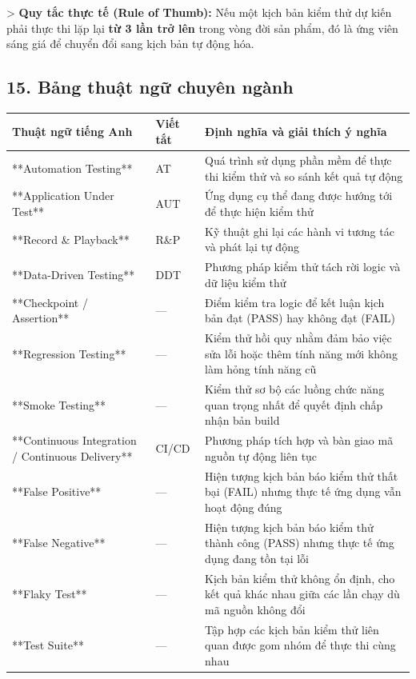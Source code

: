> \textbf{Quy tắc thực tế (Rule of Thumb):} Nếu một kịch bản kiểm thử dự kiến phải thực thi lặp lại \textbf{từ 3 lần trở lên} trong vòng đời sản phẩm, đó là ứng viên sáng giá để chuyển đổi sang kịch bản tự động hóa.


\subsection{15. Bảng thuật ngữ chuyên ngành}

\begin{table}[H]
\centering
\begin{tabular}{|l|l|l|}
\hline
\textbf{Thuật ngữ tiếng Anh} & \textbf{Viết tắt} & \textbf{Định nghĩa và giải thích ý nghĩa} \\ \hline
**Automation Testing** & AT & Quá trình sử dụng phần mềm để thực thi kiểm thử và so sánh kết quả tự động \\ \hline
**Application Under Test** & AUT & Ứng dụng cụ thể đang được hướng tới để thực hiện kiểm thử \\ \hline
**Record \& Playback** & R\&P & Kỹ thuật ghi lại các hành vi tương tác và phát lại tự động \\ \hline
**Data-Driven Testing** & DDT & Phương pháp kiểm thử tách rời logic và dữ liệu kiểm thử \\ \hline
**Checkpoint / Assertion** & — & Điểm kiểm tra logic để kết luận kịch bản đạt (PASS) hay không đạt (FAIL) \\ \hline
**Regression Testing** & — & Kiểm thử hồi quy nhằm đảm bảo việc sửa lỗi hoặc thêm tính năng mới không làm hỏng tính năng cũ \\ \hline
**Smoke Testing** & — & Kiểm thử sơ bộ các luồng chức năng quan trọng nhất để quyết định chấp nhận bản build \\ \hline
**Continuous Integration / Continuous Delivery** & CI/CD & Phương pháp tích hợp và bàn giao mã nguồn tự động liên tục \\ \hline
**False Positive** & — & Hiện tượng kịch bản báo kiểm thử thất bại (FAIL) nhưng thực tế ứng dụng vẫn hoạt động đúng \\ \hline
**False Negative** & — & Hiện tượng kịch bản báo kiểm thử thành công (PASS) nhưng thực tế ứng dụng đang tồn tại lỗi \\ \hline
**Flaky Test** & — & Kịch bản kiểm thử không ổn định, cho kết quả khác nhau giữa các lần chạy dù mã nguồn không đổi \\ \hline
**Test Suite** & — & Tập hợp các kịch bản kiểm thử liên quan được gom nhóm để thực thi cùng nhau \\ \hline

\end{tabular}
\end{table}
